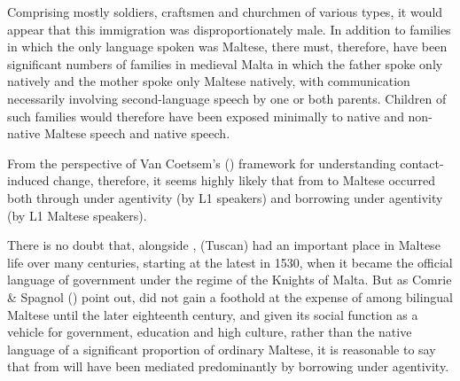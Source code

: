 \documentclass[output=paper]{langsci/langscibook}
\begin{document}
Comprising mostly soldiers, craftsmen and churchmen of various types, it would appear that this immigration was disproportionately male. In addition to families in which the only language spoken was Maltese, there must, therefore, have been significant numbers of families in medieval Malta in which the father spoke only  natively and the mother spoke only Maltese natively, with communication necessarily involving second-language speech by one or both parents. Children of such families would therefore have been exposed minimally to native and non-native Maltese speech and native  speech.

From the perspective of Van Coetsem's (\citeyear{VanCoetsem1988,VanCoetsem2000}) framework for understanding contact-induced change, therefore, it seems highly likely that  from  to Maltese occurred both through  under  agentivity (by L1  speakers) and borrowing under  agentivity (by L1 Maltese speakers).


There is no doubt that, alongside , (Tuscan)  had an important place in Maltese life over many centuries, starting at the latest in 1530, when it became the official language of government under the regime of the Knights of Malta. But as Comrie \& Spagnol (\citeyear[316]{comriespagnol2016}) point out,  did not gain a foothold at the expense of  among bilingual Maltese until the later eighteenth century, and given its social function as a vehicle for government, education and high culture, rather than the native language of a significant proportion of ordinary Maltese, it is reasonable to say that  from  will have been mediated predominantly by borrowing under  agentivity.
\end{document}
